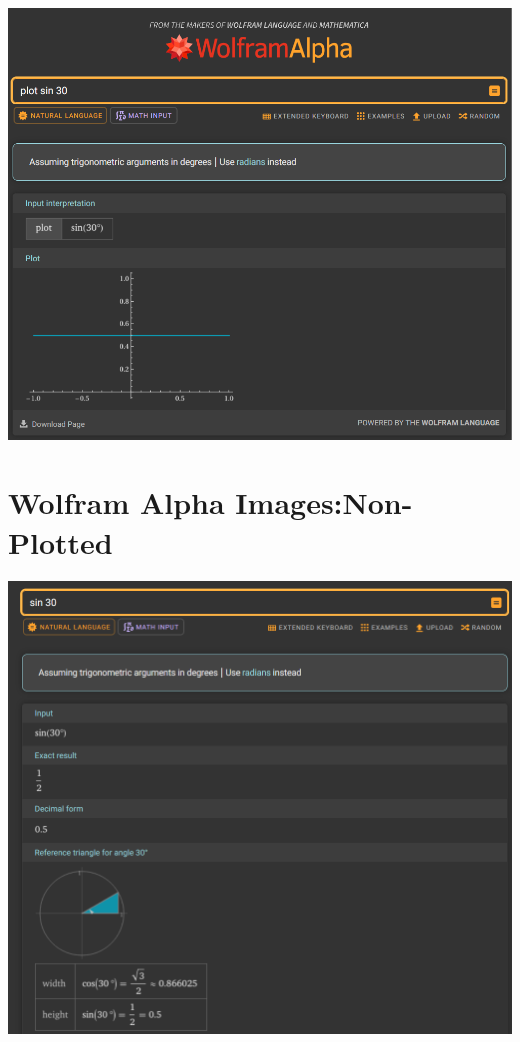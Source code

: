 \documentclass[a4paper, oneside, 11pt]{report}
\begin{document}
    \includegraphics[width=160mm]{Screenshot 2025-01-03 161746.png} \\


    \section{Wolfram Alpha Images:Non-Plotted}\label{WolframUnplotted}

    \includegraphics[width = 160mm]{Screenshot 2025-01-03 162013.png} \\

    \label{app:other}
\end{document}
